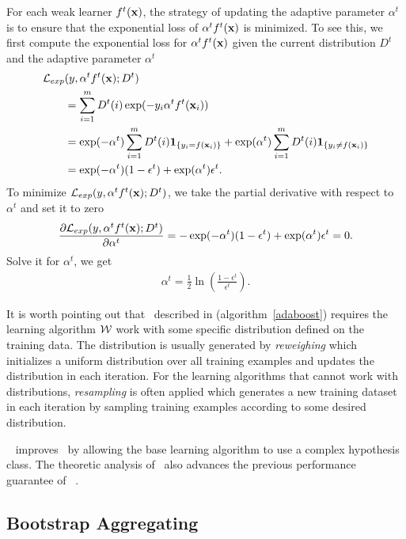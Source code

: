 {For each weak learner $f^t(\mathbf {x})$, the strategy of updating the adaptive parameter $\alpha^t$ is to ensure that the exponential loss of $\alpha^tf^t(\mathbf {x})$ is minimized.
To see this, we first compute the exponential loss for $\alpha^tf^t(\mathbf {x})$ given the current distribution $D^t$ and the adaptive parameter $\alpha^t$
\begin{align*}
	\mathcal{L}_{exp}&(y,\alpha^tf^t(\mathbf {x});D^t) \\
	&= \sum_{i=1}^mD^t(i)\exp(-y_i\alpha^tf^t(\mathbf {x}_i))\\
	&=\exp(-\alpha^t)\sum_{i=1}^mD^t(i)\mathbf{1}_{\{y_i=f(\mathbf {x}_i)\}} + \exp(\alpha^t)\sum_{i=1}^mD^t(i)\mathbf{1}_{\{y_i\neq f(\mathbf {x}_i)\}}\\
	&=\exp(-\alpha^t)(1-\epsilon^t) + \exp(\alpha^t)\epsilon^t.
\end{align*}
To minimize $\mathcal{L}_{exp}(y,\alpha^tf^t(\mathbf {x});D^t)$, we take the partial derivative with respect to $\alpha^t$ and set it to zero
\begin{align*}
	\frac{\partial\mathcal{L}_{exp}(y,\alpha^tf^t(\mathbf {x});D^t)}{\partial\alpha^t} = -\exp(-\alpha^t)(1-\epsilon^t) + \exp(\alpha^t)\epsilon^t=0.
\end{align*}
Solve it for $\alpha^t$, we get
\begin{align*}
	\alpha^{t} = \frac{1}{2}\ln\left(\frac{1-\epsilon^t}{\epsilon^t}\right).
\end{align*}

It is worth pointing out that \adaboost\ described in (algorithm~\ref{adaboost}) requires the learning algorithm $\mathcal{W}$ work with some specific distribution defined on the training data.
The distribution is usually generated by \textit{reweighing} which initializes a uniform distribution over all training examples and updates the distribution in each iteration.
For the learning algorithms that cannot work with distributions, \textit{resampling} is often applied which generates a new training dataset in each iteration by sampling training examples according to some desired distribution. 

\deepboosting\ \citep{Cortes14deep} improves \adaboost\ by allowing the base learning algorithm to use a complex hypothesis class.
The theoretic analysis of \deepboosting\ also advances the previous performance guarantee of \adaboost\ \citep{Schapire97boosting,Koltchinskii00empirical}.




\subsection{Bootstrap Aggregating} \label{sc_ba}

}
